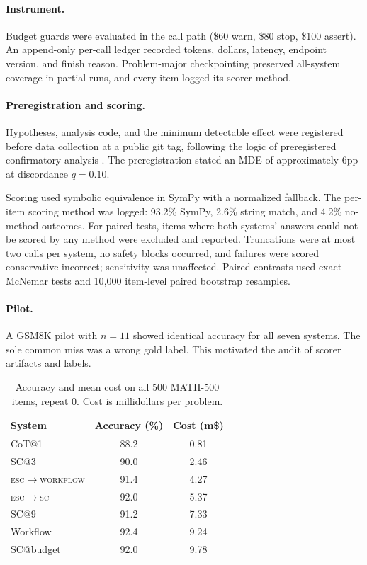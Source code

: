 \documentclass[twocolumn,10pt]{article}
\begin{document}
\paragraph{Instrument.}
Budget guards were evaluated in the call path (\$60 warn, \$80 stop, \$100 assert). An append-only per-call ledger recorded tokens, dollars, latency, endpoint version, and finish reason. Problem-major checkpointing preserved all-system coverage in partial runs, and every item logged its scorer method.

\paragraph{Preregistration and scoring.}
Hypotheses, analysis code, and the minimum detectable effect were registered before data collection at a public git tag, following the logic of preregistered confirmatory analysis \citep{nosek2018prereg}. The preregistration stated an MDE of approximately 6pp at discordance $q=0.10$.

Scoring used symbolic equivalence in SymPy with a normalized fallback. The per-item scoring method was logged: 93.2\% SymPy, 2.6\% string match, and 4.2\% no-method outcomes. For paired tests, items where both systems' answers could not be scored by any method were excluded and reported. Truncations were at most two calls per system, no safety blocks occurred, and failures were scored conservative-incorrect; sensitivity was unaffected. Paired contrasts used exact McNemar tests \citep{mcnemar1947} and 10{,}000 item-level paired bootstrap resamples.

\paragraph{Pilot.}
A GSM8K pilot with $n=11$ showed identical accuracy for all seven systems. The sole common miss was a wrong gold label. This motivated the audit of scorer artifacts and labels.

\begin{table}[t]
\centering
\caption{Accuracy and mean cost on all 500 MATH-500 items, repeat 0. Cost is millidollars per problem.}
\label{tab:main}
\small
\begin{tabular}{lcc}
\toprule
System & Accuracy (\%) & Cost (m\$) \\
\midrule
CoT@1 & 88.2 & 0.81 \\
SC@3 & 90.0 & 2.46 \\
\textsc{esc}$\to$\textsc{workflow} & 91.4 & 4.27 \\
\textsc{esc}$\to$\textsc{sc} & 92.0 & 5.37 \\
SC@9 & 91.2 & 7.33 \\
Workflow & 92.4 & 9.24 \\
SC@budget & 92.0 & 9.78 \\
\bottomrule
\end{tabular}
\end{table}
\end{document}
